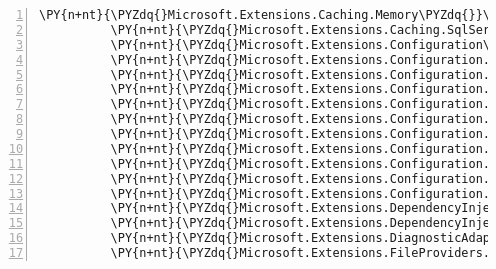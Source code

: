 \begin{Verbatim}[commandchars=\\\{\},numbers=left,firstnumber=1,stepnumber=1,numberblanklines=0]
          \PY{n+nt}{\PYZdq{}Microsoft.Extensions.Caching.Memory\PYZdq{}}\PY{p}{:} \PY{l+s+s2}{\PYZdq{}2.1.0\PYZhy{}rc1\PYZhy{}final\PYZdq{}}\PY{p}{,}
          \PY{n+nt}{\PYZdq{}Microsoft.Extensions.Caching.SqlServer\PYZdq{}}\PY{p}{:} \PY{l+s+s2}{\PYZdq{}2.1.0\PYZhy{}rc1\PYZhy{}final\PYZdq{}}\PY{p}{,}
          \PY{n+nt}{\PYZdq{}Microsoft.Extensions.Configuration\PYZdq{}}\PY{p}{:} \PY{l+s+s2}{\PYZdq{}2.1.0\PYZhy{}rc1\PYZhy{}final\PYZdq{}}\PY{p}{,}
          \PY{n+nt}{\PYZdq{}Microsoft.Extensions.Configuration.Abstractions\PYZdq{}}\PY{p}{:} \PY{l+s+s2}{\PYZdq{}2.1.0\PYZhy{}rc1\PYZhy{}final\PYZdq{}}\PY{p}{,}
          \PY{n+nt}{\PYZdq{}Microsoft.Extensions.Configuration.Binder\PYZdq{}}\PY{p}{:} \PY{l+s+s2}{\PYZdq{}2.1.0\PYZhy{}rc1\PYZhy{}final\PYZdq{}}\PY{p}{,}
          \PY{n+nt}{\PYZdq{}Microsoft.Extensions.Configuration.CommandLine\PYZdq{}}\PY{p}{:} \PY{l+s+s2}{\PYZdq{}2.1.0\PYZhy{}rc1\PYZhy{}final\PYZdq{}}\PY{p}{,}
          \PY{n+nt}{\PYZdq{}Microsoft.Extensions.Configuration.EnvironmentVariables\PYZdq{}}\PY{p}{:} \PY{l+s+s2}{\PYZdq{}2.1.0\PYZhy{}rc1\PYZhy{}final\PYZdq{}}\PY{p}{,}
          \PY{n+nt}{\PYZdq{}Microsoft.Extensions.Configuration.FileExtensions\PYZdq{}}\PY{p}{:} \PY{l+s+s2}{\PYZdq{}2.1.0\PYZhy{}rc1\PYZhy{}final\PYZdq{}}\PY{p}{,}
          \PY{n+nt}{\PYZdq{}Microsoft.Extensions.Configuration.Ini\PYZdq{}}\PY{p}{:} \PY{l+s+s2}{\PYZdq{}2.1.0\PYZhy{}rc1\PYZhy{}final\PYZdq{}}\PY{p}{,}
          \PY{n+nt}{\PYZdq{}Microsoft.Extensions.Configuration.Json\PYZdq{}}\PY{p}{:} \PY{l+s+s2}{\PYZdq{}2.1.0\PYZhy{}rc1\PYZhy{}final\PYZdq{}}\PY{p}{,}
          \PY{n+nt}{\PYZdq{}Microsoft.Extensions.Configuration.KeyPerFile\PYZdq{}}\PY{p}{:} \PY{l+s+s2}{\PYZdq{}2.1.0\PYZhy{}rc1\PYZhy{}final\PYZdq{}}\PY{p}{,}
          \PY{n+nt}{\PYZdq{}Microsoft.Extensions.Configuration.UserSecrets\PYZdq{}}\PY{p}{:} \PY{l+s+s2}{\PYZdq{}2.1.0\PYZhy{}rc1\PYZhy{}final\PYZdq{}}\PY{p}{,}
          \PY{n+nt}{\PYZdq{}Microsoft.Extensions.Configuration.Xml\PYZdq{}}\PY{p}{:} \PY{l+s+s2}{\PYZdq{}2.1.0\PYZhy{}rc1\PYZhy{}final\PYZdq{}}\PY{p}{,}
          \PY{n+nt}{\PYZdq{}Microsoft.Extensions.DependencyInjection\PYZdq{}}\PY{p}{:} \PY{l+s+s2}{\PYZdq{}2.1.0\PYZhy{}rc1\PYZhy{}final\PYZdq{}}\PY{p}{,}
          \PY{n+nt}{\PYZdq{}Microsoft.Extensions.DependencyInjection.Abstractions\PYZdq{}}\PY{p}{:} \PY{l+s+s2}{\PYZdq{}2.1.0\PYZhy{}rc1\PYZhy{}final\PYZdq{}}\PY{p}{,}
          \PY{n+nt}{\PYZdq{}Microsoft.Extensions.DiagnosticAdapter\PYZdq{}}\PY{p}{:} \PY{l+s+s2}{\PYZdq{}2.1.0\PYZhy{}rc1\PYZhy{}final\PYZdq{}}\PY{p}{,}
          \PY{n+nt}{\PYZdq{}Microsoft.Extensions.FileProviders.Abstractions\PYZdq{}}\PY{p}{:} \PY{l+s+s2}{\PYZdq{}2.1.0\PYZhy{}rc1\PYZhy{}final\PYZdq{}}\PY{p}{,}

\end{Verbatim}

